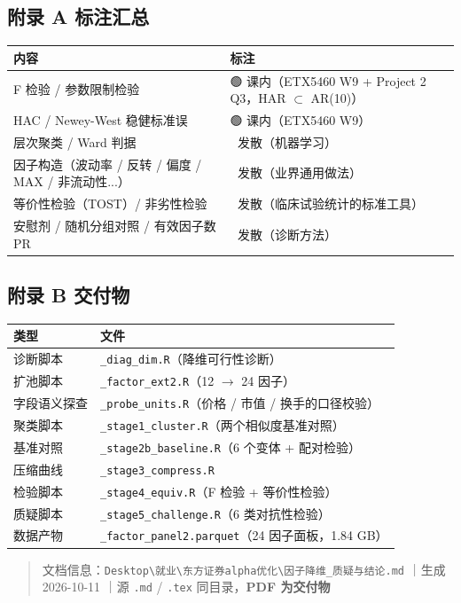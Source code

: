 \documentclass[11pt]{article}
\begin{document}
\subsection{\texorpdfstring{附录 A \textperiodcentered{} 标注汇总}{附录 A · 标注汇总}}
{\small
\begin{longtable}{p{8.10cm}p{8.10cm}}
\toprule
内容 & 标注 \\
\midrule
F 检验 / 参数限制检验 & 🟢 课内（ETX5460 W9 + Project 2 Q3，HAR \ensuremath{\subset} AR(10)） \\
HAC / Newey-West 稳健标准误 & 🟢 课内（ETX5460 W9） \\
层次聚类 / Ward 判据 & 🔴 发散（机器学习） \\
因子构造（波动率 / 反转 / 偏度 / MAX / 非流动性...） & 🔴 发散（业界通用做法） \\
等价性检验（TOST）/ 非劣性检验 & 🔴 发散（临床试验统计的标准工具） \\
安慰剂 / 随机分组对照 / 有效因子数 PR & 🔴 发散（诊断方法） \\
\bottomrule
\end{longtable}
}
\subsection{\texorpdfstring{附录 B \textperiodcentered{} 交付物}{附录 B · 交付物}}
{\small
\begin{longtable}{p{3.24cm}p{12.96cm}}
\toprule
类型 & 文件 \\
\midrule
诊断脚本 & \texttt{\_diag\_dim.R}（降维可行性诊断） \\
扩池脚本 & \texttt{\_factor\_ext2.R}（12 \ensuremath{\rightarrow} 24 因子） \\
字段语义探查 & \texttt{\_probe\_units.R}（价格 / 市值 / 换手的口径校验） \\
聚类脚本 & \texttt{\_stage1\_cluster.R}（两个相似度基准对照） \\
基准对照 & \texttt{\_stage2b\_baseline.R}（6 个变体 + 配对检验） \\
压缩曲线 & \texttt{\_stage3\_compress.R} \\
检验脚本 & \texttt{\_stage4\_equiv.R}（F 检验 + 等价性检验） \\
质疑脚本 & \texttt{\_stage5\_challenge.R}（6 类对抗性检验） \\
数据产物 & \texttt{\_factor\_panel2.parquet}（24 因子面板，1.84 GB） \\
\bottomrule
\end{longtable}
}
\begin{quote}
文档信息：\texttt{Desktop\textbackslash{}就业\textbackslash{}东方证券alpha优化\textbackslash{}因子降维\_质疑与结论.md} ｜生成 2026-10-11 ｜源 \texttt{.md} / \texttt{.tex} 同目录，\textbf{PDF 为交付物}
\end{quote}
\end{document}
